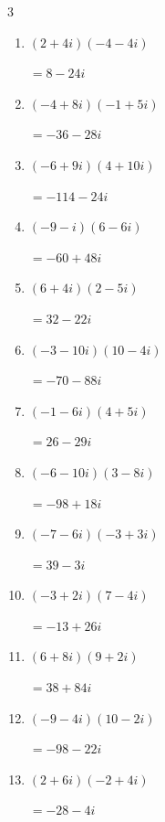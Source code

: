 \begin{multicols}{3}
\begin{enumerate}
        $\displaystyle =84-47i$

\columnbreak %

  \item $\displaystyle (2+4i)(-4-4i)$

        $\displaystyle =8-24i$

  \item $\displaystyle (-4+8i)(-1+5i)$

        $\displaystyle =-36-28i$

  \item $\displaystyle (-6+9i)(4+10i)$

        $\displaystyle =-114-24i$

  \item $\displaystyle (-9-i)(6-6i)$

        $\displaystyle =-60+48i$

  \item $\displaystyle (6+4i)(2-5i)$

        $\displaystyle =32-22i$

  \item $\displaystyle (-3-10i)(10-4i)$

        $\displaystyle =-70-88i$

  \item $\displaystyle (-1-6i)(4+5i)$

        $\displaystyle =26-29i$

  \item $\displaystyle (-6-10i)(3-8i)$

        $\displaystyle =-98+18i$

  \item $\displaystyle (-7-6i)(-3+3i)$

        $\displaystyle =39-3i$

  \item $\displaystyle (-3+2i)(7-4i)$

        $\displaystyle =-13+26i$

  \item $\displaystyle (6+8i)(9+2i)$

        $\displaystyle =38+84i$

  \item $\displaystyle (-9-4i)(10-2i)$

        $\displaystyle =-98-22i$

  \item $\displaystyle (2+6i)(-2+4i)$

        $\displaystyle =-28-4i$


\end{enumerate}
\end{multicols}
